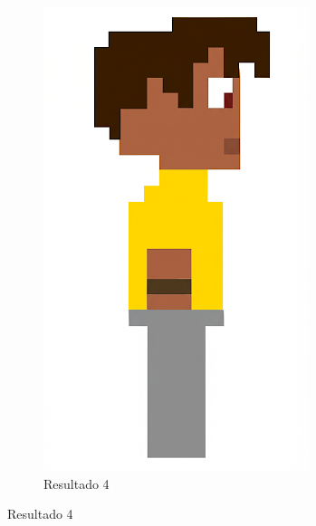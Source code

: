 \begin{figure}[htbp]
\begin{subfigure}{0.23\linewidth}
        \includegraphics[width=1\linewidth]{figs/geminiPro/chat6/tela2_res4.png}
        \caption{\small Resultado 4}
        \label{fig:geminiPro18d}
    \end{subfigure}
\end{figure}

